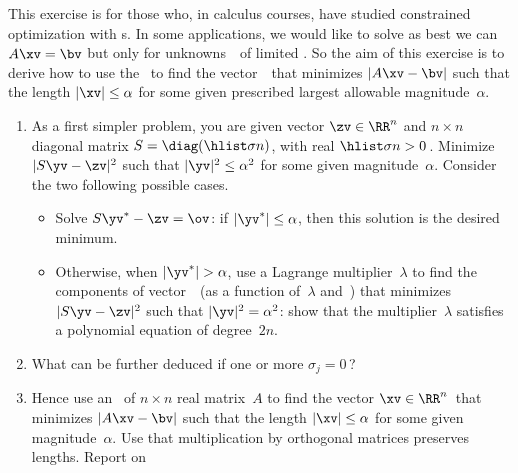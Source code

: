 \begin{exercise}  
This exercise is for those who, in calculus courses, have studied constrained optimization with s. 
In some applications, we would like to solve as best we can \(A\xv=\bv\) but only for unknowns~\xv\ of limited .
So the aim of this exercise is to derive how to use the \svd\ to find the vector~\xv\ that minimizes \(|A\xv-\bv|\) such that the length \(|\xv|\leq\alpha\) for some given prescribed largest allowable magnitude~\(\alpha\).
\begin{enumerate}
\item As a first simpler problem, you are given vector \(\zv\in\RR^n\) and \(n\times n\) diagonal matrix \(S=\diag(\hlist\sigma n)\), with real \(\hlist\sigma n>0\)\,.
Minimize \(|S\yv-\zv|^2\) such that \(|\yv|^2\leq\alpha^2\) for some given magnitude~\(\alpha\).
Consider the two following possible cases.
\begin{itemize}
\item Solve \(S\yv^*-\zv=\ov\): if \(|\yv^*|\leq\alpha\), then this solution is the desired minimum.
\item Otherwise, when \(|\yv^*|>\alpha\), use a Lagrange multiplier~\(\lambda\) to find the components of vector~\yv\ (as a function of~\(\lambda\) and~\zv) that minimizes \(|S\yv-\zv|^2\) such that \(|\yv|^2=\alpha^2\):  show that the multiplier~\(\lambda\) satisfies a polynomial equation of degree~\(2n\).
\end{itemize}

\item What can be further deduced if one or more \(\sigma_j=0\)\,?

\item Hence use an \svd\ of \(n\times n\) real matrix~\(A\) to find the vector \(\xv\in\RR^n\)\ that minimizes \(|A\xv-\bv|\) such that the length \(|\xv|\leq\alpha\) for some given magnitude~\(\alpha\).
Use that multiplication by orthogonal matrices preserves lengths.
Report on 
\end{enumerate}
\end{exercise}






